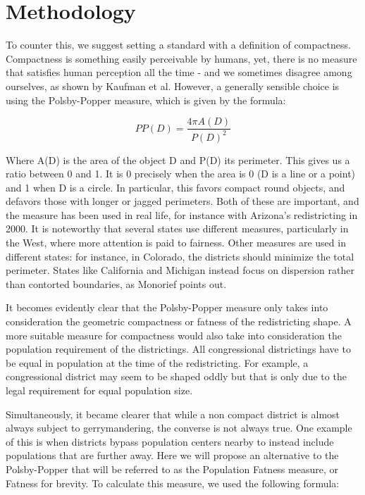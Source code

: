 \documentclass[letterpaper]{article}
\begin{document}
\section{Methodology}
To counter this, we suggest setting a standard with a definition of compactness. Compactness is something easily perceivable by humans, yet, there is no measure that satisfies human perception all the time - and we sometimes disagree among ourselves, as shown by Kaufman et al. 
However, a generally sensible choice is using the Polsby-Popper measure, which is given by the formula:

\[
	PP(D) = \frac{4\pi A(D)}{P(D)^2}
\]


Where A(D) is the area of the object D and P(D) its perimeter. This gives us a ratio between 0 and 1. It is 0 precisely when the area is 0 (D is a line or a point) and 1 when D is a circle. In particular, this favors compact round objects, and defavors those with longer or jagged perimeters. Both of these are important, and the measure has been used in real life, for instance with Arizona’s redistricting in 2000. It is noteworthy that several states use different measures, particularly in the West, where more attention is paid to fairness.
Other measures are used in different states: for instance, in Colorado, the districts should minimize the total perimeter. States like California and Michigan instead focus on dispersion rather than contorted boundaries, as Monorief points out. 

It becomes evidently clear that the Polsby-Popper measure only takes into consideration the geometric compactness or fatness of the redistricting shape. A more suitable measure for compactness would also take into consideration the population requirement of the districtings. All congressional districtings have to be equal in population at the time of the redistricting. For example, a congressional district may seem to be shaped oddly but that is only due to the legal requirement for equal population size.

Simultaneously, it became clearer that while a non compact district is almost always subject to gerrymandering, the converse is not always true. One example of this is when districts bypass population centers nearby to instead include populations that are further away.
Here we will propose an alternative to the Polsby-Popper that will be referred to as the Population Fatness measure, or Fatness for brevity. 
To calculate this measure, we used the following formula:
\end{document}
